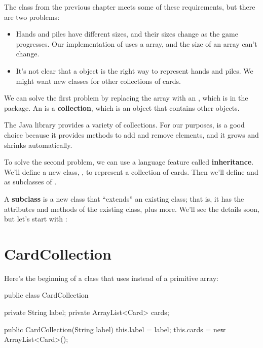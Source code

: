 The  class from the previous chapter meets some of these requirements, but there are two problems:

\begin{itemize}

\item Hands and piles have different sizes, and their sizes change as the game progresses.
Our implementation of  uses a  array, and the size of an array can't change.

\item It's not clear that a  object is the right way to represent hands and piles.
We might want new classes for other collections of cards.

\end{itemize}


We can solve the first problem by replacing the  array with an , which is in the  package.
An  is a {\bf collection}, which is an object that contains other objects.

The Java library provides a variety of collections.
For our purposes,  is a good choice because it provides methods to add and remove elements, and it grows and shrinks automatically.


To solve the second problem, we can use a language feature called {\bf inheritance}.
We'll define a new class, , to represent a collection of cards.
Then we'll define  and  as subclasses of .


A {\bf subclass} is a new class that ``extends'' an existing class; that is, it has the attributes and methods of the existing class, plus more.
We'll see the details soon, but let's start with :


\section{CardCollection}

Here's the beginning of a  class that uses  instead of a primitive array:

\begin{code}
public class CardCollection {

    private String label;
    private ArrayList<Card> cards;

    public CardCollection(String label) {
        this.label = label;
        this.cards = new ArrayList<Card>();
    }
}
\end{code}

